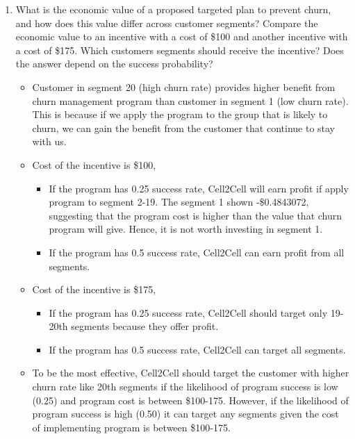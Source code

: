 \documentclass[
]{article}
\providecommand{\tightlist}{%
  \setlength{\itemsep}{0pt}\setlength{\parskip}{0pt}}
\begin{document}
\begin{enumerate}
\def\labelenumi{\arabic{enumi}.}
\setcounter{enumi}{3}
\item
  What is the economic value of a proposed targeted plan to prevent
  churn, and how does this value differ across customer segments?
  Compare the economic value to an incentive with a cost of \$100 and
  another incentive with a cost of \$175. Which customers segments
  should receive the incentive? Does the answer depend on the success
  probability?

  \begin{itemize}
  \tightlist
  \item
    Customer in segment 20 (high churn rate) provides higher benefit
    from churn management program than customer in segment 1 (low churn
    rate). This is because if we apply the program to the group that is
    likely to churn, we can gain the benefit from the customer that
    continue to stay with us.
  \item
    Cost of the incentive is \$100,

    \begin{itemize}
    \tightlist
    \item
      If the program has 0.25 success rate, Cell2Cell will earn profit
      if apply program to segment 2-19. The segment 1 shown
      -\$0.4843072, suggesting that the program cost is higher than the
      value that churn program will give. Hence, it is not worth
      investing in segment 1.
    \item
      If the program has 0.5 success rate, Cell2Cell can earn profit
      from all segments.
    \end{itemize}
  \item
    Cost of the incentive is \$175,

    \begin{itemize}
    \tightlist
    \item
      If the program has 0.25 success rate, Cell2Cell should target only
      19-20th segments because they offer profit.
    \item
      If the program has 0.5 success rate, Cell2Cell can target all
      segments.
    \end{itemize}
  \item
    To be the most effective, Cell2Cell should target the customer with
    higher churn rate like 20th segments if the likelihood of program
    success is low (0.25) and program cost is between \$100-175.
    However, if the likelihood of program success is high (0.50) it can
    target any segments given the cost of implementing program is
    between \$100-175.
  \end{itemize}
\end{enumerate}
\end{document}
